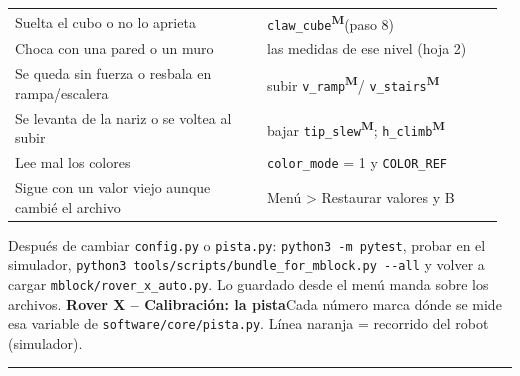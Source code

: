 \documentclass[9pt]{extarticle}
\newcommand{\menu}{\textsuperscript{\tiny\sffamily\bfseries M}}
\begin{document}
\begin{minipage}[t]{0.42\linewidth}
\begin{tabular}{@{}>{\raggedright\arraybackslash}p{0.5\linewidth}>{\raggedright\arraybackslash}p{0.47\linewidth}@{}}
Suelta el cubo o no lo aprieta & \texttt{claw\_\allowbreak{}cube}\menu (paso 8) \\
Choca con una pared o un muro & las medidas de ese nivel (hoja 2) \\
Se queda sin fuerza o resbala en rampa/escalera & subir \texttt{v\_\allowbreak{}ramp}\menu / \texttt{v\_\allowbreak{}stairs}\menu \\
Se levanta de la nariz o se voltea al subir & bajar \texttt{tip\_\allowbreak{}slew}\menu; \texttt{h\_\allowbreak{}climb}\menu \\
Lee mal los colores & \texttt{color\_\allowbreak{}mode} = 1 y \texttt{COLOR\_\allowbreak{}REF} \\
Sigue con un valor viejo aunque cambié el archivo & Menú > Restaurar valores y B \\
\end{tabular}
\end{minipage}
\par\vfill{\scriptsize Después de cambiar \texttt{config.py} o \texttt{pista.py}: \texttt{python3 -m pytest}, probar en el simulador, \texttt{python3 tools/scripts/bundle\_for\_mblock.py -{}-all} y volver a cargar \texttt{mblock/rover\_x\_auto.py}. Lo guardado desde el menú manda sobre los archivos.}
\newpage
{\LARGE\bfseries Rover X -- Calibración: la pista}\hfill{\small Cada número marca dónde se mide esa variable de \texttt{software/core/pista.py}. Línea naranja = recorrido del robot (simulador).}\par\vspace{1pt}\hrule\vspace{3pt}
\end{document}
